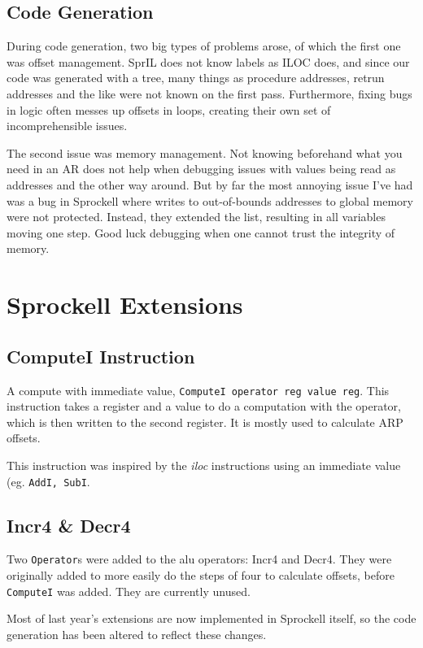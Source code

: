 \documentclass[twoside]{report}
\begin{document}
\section{Code Generation}
During code generation, two big types of problems arose, of which the first one was offset management. SprIL does not know labels as ILOC does, and since our code was generated with a tree, many things as procedure addresses, retrun addresses and the like were not known on the first pass. Furthermore, fixing bugs in logic often messes up offsets in loops, creating their own set of incomprehensible issues.

The second issue was memory management. Not knowing beforehand what you need in an AR does not help when debugging issues with values being read as addresses and the other way around. But by far the most annoying issue I've had was a bug in Sprockell where writes to out-of-bounds addresses to global memory were not protected. Instead, they extended the list, resulting in all variables moving one step. Good luck debugging when one cannot trust the integrity of memory.


\chapter{Sprockell Extensions}
\label{sprockell_extensions}

\section{ComputeI Instruction}
\label{computei_instruction}
A compute with immediate value, \texttt{ComputeI operator reg value reg}. This instruction takes a register and a value to do a computation with the operator, which is then written to the second register. It is mostly used to calculate ARP offsets. 

This instruction was inspired by the \emph{iloc} instructions using an immediate value (eg. \texttt{AddI, SubI}.

\section{Incr4 \& Decr4}
\label{incr4_and_decr4}
Two \texttt{Operator}s were added to the alu operators: Incr4 and Decr4. They were originally added to more easily do the steps of four to calculate offsets, before \texttt{ComputeI} was added. They are currently unused.

Most of last year's extensions are now implemented in Sprockell itself, so the code generation has been altered to reflect these changes.
\end{document}
